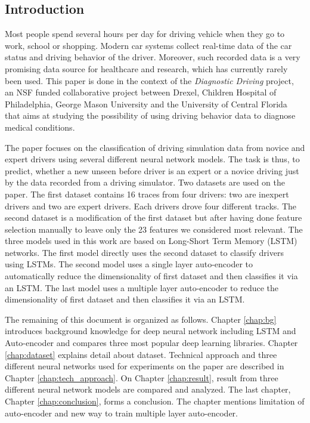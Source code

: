 \documentclass[draft,dvipsnames]{drexel-thesis}
\begin{document}
\begin{thesis}



\chapter{Introduction}\label{chap:intro}
Most people spend several hours per day for driving vehicle when they go to work, school or shopping. Modern car systems collect real-time data of the car status and driving behavior of the driver. Moreover, such recorded data is a very promising data source for healthcare and research, which has currently rarely been used. This paper is done in the context of the {\em Diagnostic Driving} project, an NSF funded collaborative project between Drexel, Children Hospital of Philadelphia, George Mason University and the University of Central Florida that aims at studying the possibility of using driving behavior data to diagnose medical conditions.

The paper focuses on the classification of driving simulation data from novice and expert drivers using several different neural network models. The task is thus, to predict, whether a new unseen before driver is an expert or a novice driving just by the data recorded from a driving simulator. Two datasets are used on the paper. The first dataset contains 16 traces from four drivers: two are inexpert drivers and two are expert drivers. Each drivers drove four different tracks. The second dataset is a modification of the first dataset but after having done feature selection manually to leave only the 23 features we considered most relevant. The three models used in this work are based on Long-Short Term Memory (LSTM) networks. The first model directly uses the second dataset to classify drivers using LSTMs. The second model uses a single layer auto-encoder to automatically reduce the dimensionality of first dataset and then classifies it via an LSTM. The last model uses a multiple layer auto-encoder to reduce the dimensionality of first dataset and then classifies it via an LSTM. 

The remaining of this document is organized as follows. Chapter \ref{chap:bg} introduces background knowledge for deep neural network including LSTM and Auto-encoder and compares three most popular deep learning libraries. Chapter \ref{chap:dataset} explains detail about dataset. Technical approach and three different neural networks used for experiments on the paper are described in Chapter \ref{chap:tech_approach}. On Chapter \ref{chap:result}, result from three different neural network models are compared and analyzed. The last chapter, Chapter \ref{chap:conclusion}, forms a conclusion. The chapter mentions limitation of auto-encoder and new way to train multiple layer auto-encoder.



\end{thesis}
\end{document}
